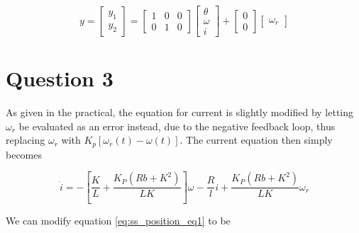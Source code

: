 \documentclass[a4paper, 12pt]{article}
\begin{document}
\begin{equation}
  y =
  \left[
  \begin{array}{rcl}
	  y_1 \\
	  y_2
  \end{array}
  \right]
  =
  \left[
  \begin{array}{ccc}
    1 & 0 & 0 \\
    0 & 1 & 0
  \end{array}
  \right]
  \left[
  \begin{array}{c}
    \theta \\
    \omega \\
    i
  \end{array}
  \right]
  +
  \left[
  \begin{array}{c}
    0 \\
    0
  \end{array}
  \right]
  \left[
  \begin{array}{c}
    \omega_r
  \end{array}
  \right]
  \label{eq:ss_position_eq2}
\end{equation}

\section{Question 3}

As given in the practical, the equation for current is slightly modified by
letting $\omega_r$ be evaluated as an error instead, due to the negative
feedback loop, thus replacing $\omega_r$ with $K_p[\omega_r(t) - \omega(t)]$.
The current equation then simply becomes

\begin{equation}
	\dot i = -\left[ \frac{K}{L} + \frac{K_P(Rb + K^2)}{LK} \right]\omega - \frac{R}{l}i + \frac{K_P(Rb + K^2)}{LK}\omega_r
	\label{eq:3_current}
\end{equation}

We can modify equation \eqref{eq:ss_position_eq1} to be
\end{document}
